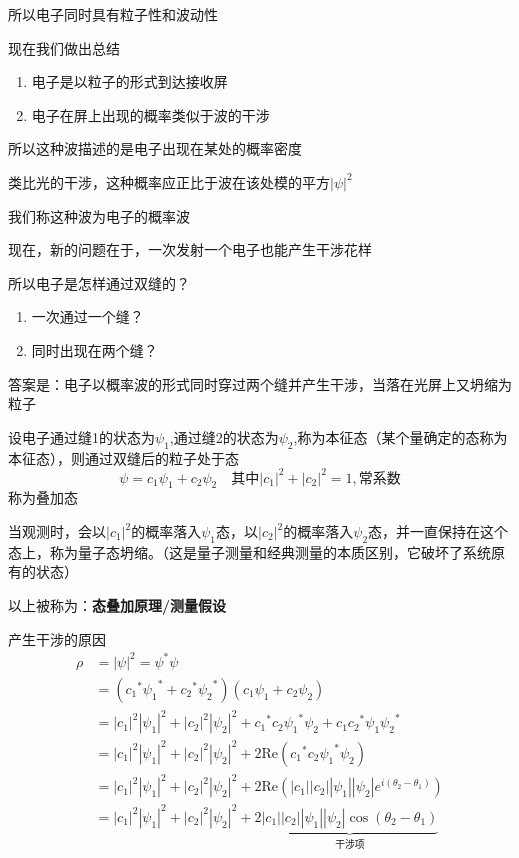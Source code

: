 \documentclass[lang=cn,10pt]{elegantbook}
\begin{document}
所以电子同时具有粒子性和波动性

现在我们做出总结
\begin{enumerate}
	\item 电子是以粒子的形式到达接收屏
	\item 电子在屏上出现的概率类似于波的干涉
\end{enumerate}
所以这种波描述的是电子出现在某处的概率密度

类比光的干涉，这种概率应正比于波在该处模的平方$|\psi|^2$

我们称这种波为电子的概率波

现在，新的问题在于，一次发射一个电子也能产生干涉花样

所以电子是怎样通过双缝的？
\begin{enumerate}
	\item 一次通过一个缝？
	\item 同时出现在两个缝？
\end{enumerate}
答案是：电子以概率波的形式同时穿过两个缝并产生干涉，当落在光屏上又坍缩为粒子

设电子通过缝1的状态为$\psi_1$,通过缝2的状态为$\psi_2$,称为本征态（某个量确定的态称为本征态），则通过双缝后的粒子处于态
\begin{equation}
	\psi=c_1\psi_1+c_2\psi_2\quad\text{其中}|c_1|^2+|c_2|^2=1,\text{常系数}
\end{equation}
称为叠加态

当观测时，会以$|c_1|^2$的概率落入$\psi_1$态，以$|c_2|^2$的概率落入$\psi_2$态，并一直保持在这个态上，称为量子态坍缩。（这是量子测量和经典测量的本质区别，它破坏了系统原有的状态）

以上被称为：\textbf{态叠加原理/测量假设}

产生干涉的原因
\begin{equation}
	\begin{split}
		\rho &=|\psi |^2=\psi ^*\psi 
		\\
		&=\left( {c_1}^*{\psi _1}^*+{c_2}^*{\psi _2}^* \right) \left( c_1\psi _1+c_2\psi _2 \right) 
		\\
		&=|c_1|^2|\psi _1|^2+|c_2|^2|\psi _2|^2+{c_1}^*c_2{\psi _1}^*\psi _2+c_1{c_2}^*\psi _1{\psi _2}^*
		\\
		&=|c_1|^2|\psi _1|^2+|c_2|^2|\psi _2|^2+2\mathrm{Re}\left( {c_1}^*c_2{\psi _1}^*\psi _2 \right) 
		\\
		&=|c_1|^2|\psi _1|^2+|c_2|^2|\psi _2|^2+2\mathrm{Re}\left( |c_1||c_2||\psi _1||\psi _2|e^{i\left( \theta _2-\theta _1 \right)} \right) 
		\\
		&=|c_1|^2|\psi _1|^2+|c_2|^2|\psi _2|^2+2\underset{\text{干涉项}}{\underbrace{|c_1||c_2||\psi _1||\psi _2|\cos \left( \theta _2-\theta _1 \right) }}
	\end{split}
\end{equation}
\end{document}
